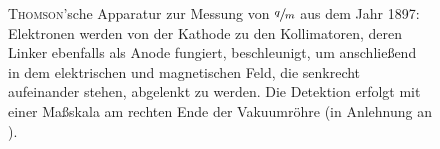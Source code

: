 \begin{figure}[htbp]
  \caption[Apparatur zur $\nicefrac{q}{m}$-Messung]{\textsc{Thomson}'sche Apparatur zur Messung von $\nicefrac{q}{m}$ aus dem Jahr 1897: Elektronen werden von der Kathode zu den Kollimatoren, deren Linker ebenfalls als Anode fungiert, beschleunigt, um anschließend in dem elektrischen und magnetischen Feld, die senkrecht aufeinander stehen, abgelenkt zu werden. Die Detektion erfolgt mit einer Maßskala am rechten Ende der Vakuumröhre (in Anlehnung an \cite[S.\,147]{Tipler2010}).}
  \label{fig:thoms1}
  \vspace{-0pt}
\end{figure}